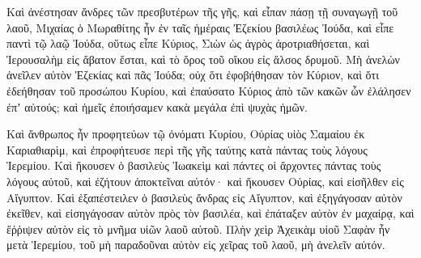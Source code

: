 {Καὶ ἀνέστησαν ἄνδρες τῶν πρεσβυτέρων τῆς γῆς, καὶ εἶπαν πάσῃ τῇ συναγωγῇ τοῦ λαοῦ,
Μιχαίας ὁ Μωραθίτης ἦν ἐν ταῖς ἡμέραις Ἐζεκίου βασιλέως Ἰούδα, καὶ εἶπε παντὶ τῷ λαῷ Ἰούδα, οὕτως εἶπε Κύριος, Σιὼν ὡς ἀγρὸς ἀροτριαθήσεται, καὶ Ἱερουσαλὴμ εἰς ἄβατον ἔσται, καὶ τὸ ὄρος τοῦ οἴκου εἰς ἄλσος δρυμοῦ.
Μὴ ἀνελὼν ἀνεῖλεν αὐτὸν Ἐζεκίας καὶ πᾶς Ἰούδα; οὐχ ὅτι ἐφοβήθησαν τὸν Κύριον, καὶ ὅτι ἐδεήθησαν τοῦ προσώπου Κυρίου, καὶ ἐπαύσατο Κύριος ἀπὸ τῶν κακῶν ὧν ἐλάλησεν ἐπʼ αὐτούς; καὶ ἡμεῖς ἐποιήσαμεν κακὰ μεγάλα ἐπὶ ψυχὰς ἡμῶν.
\par }{\PP {}Καὶ ἄνθρωπος ἦν προφητεύων τῷ ὀνόματι Κυρίου, Οὐρίας υἱὸς Σαμαίου ἐκ Καριαθιαρὶμ, καὶ ἐπροφήτευσε περὶ τῆς γῆς ταύτης κατὰ πάντας τοὺς λόγους Ἱερεμίου.
Καὶ ἤκουσεν ὁ βασιλεὺς Ἰωακεὶμ καὶ πάντες οἱ ἄρχοντες πάντας τοὺς λόγους αὐτοῦ, καὶ ἐζήτουν ἀποκτεῖναι αὐτόν· καὶ ἤκουσεν Οὐρίας, καὶ εἰσῆλθεν εἰς Αἴγυπτον.
Καὶ ἐξαπέστειλεν ὁ βασιλεὺς ἄνδρας εἰς Αἴγυπτον,
καὶ ἐξηγάγοσαν αὐτὸν ἐκεῖθεν, καὶ εἰσηγάγοσαν αὐτὸν πρὸς τὸν βασιλέα, καὶ ἐπάταξεν αὐτὸν ἐν μαχαίρᾳ, καὶ ἔῤῥιψεν αὐτὸν εἰς τὸ μνῆμα υἱῶν λαοῦ αὐτοῦ.
Πλὴν χεὶρ Ἀχεικὰμ υἱοῦ Σαφὰν ἦν μετὰ Ἱερεμίου, τοῦ μὴ παραδοῦναι αὐτὸν εἰς χεῖρας τοῦ λαοῦ, μὴ ἀνελεῖν αὐτόν.

}
